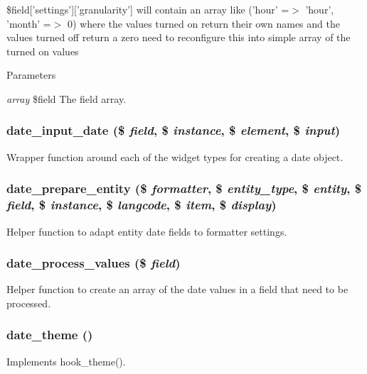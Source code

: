 \$field\mbox{[}'settings'\mbox{]}\mbox{[}'granularity'\mbox{]} will contain an array like ('hour' =$>$ 'hour', 'month' =$>$ 0) where the values turned on return their own names and the values turned off return a zero need to reconfigure this into simple array of the turned on values


\begin{DoxyParams}{Parameters}
\item[{\em array}]\$field The field array. \end{DoxyParams}
\hypertarget{date_8module_a7b44720b330f4318eb971537b64a27ad}{
\subsubsection[{date\_\-input\_\-date}]{\setlength{\rightskip}{0pt plus 5cm}date\_\-input\_\-date (\$ {\em field}, \/  \$ {\em instance}, \/  \$ {\em element}, \/  \$ {\em input})}}
\label{date_8module_a7b44720b330f4318eb971537b64a27ad}
Wrapper function around each of the widget types for creating a date object. \hypertarget{date_8module_a39cd033956c5dc51331bad9eb2cebd81}{
\subsubsection[{date\_\-prepare\_\-entity}]{\setlength{\rightskip}{0pt plus 5cm}date\_\-prepare\_\-entity (\$ {\em formatter}, \/  \$ {\em entity\_\-type}, \/  \$ {\em entity}, \/  \$ {\em field}, \/  \$ {\em instance}, \/  \$ {\em langcode}, \/  \$ {\em item}, \/  \$ {\em display})}}
\label{date_8module_a39cd033956c5dc51331bad9eb2cebd81}
Helper function to adapt entity date fields to formatter settings. \hypertarget{date_8module_a32f61cf4fd59beedd48c7a7be04c1693}{
\subsubsection[{date\_\-process\_\-values}]{\setlength{\rightskip}{0pt plus 5cm}date\_\-process\_\-values (\$ {\em field})}}
\label{date_8module_a32f61cf4fd59beedd48c7a7be04c1693}
Helper function to create an array of the date values in a field that need to be processed. \hypertarget{date_8module_a9f95819df33aab94d18f4461985d1028}{
\subsubsection[{date\_\-theme}]{\setlength{\rightskip}{0pt plus 5cm}date\_\-theme ()}}
\label{date_8module_a9f95819df33aab94d18f4461985d1028}
Implements hook\_\-theme(). 
